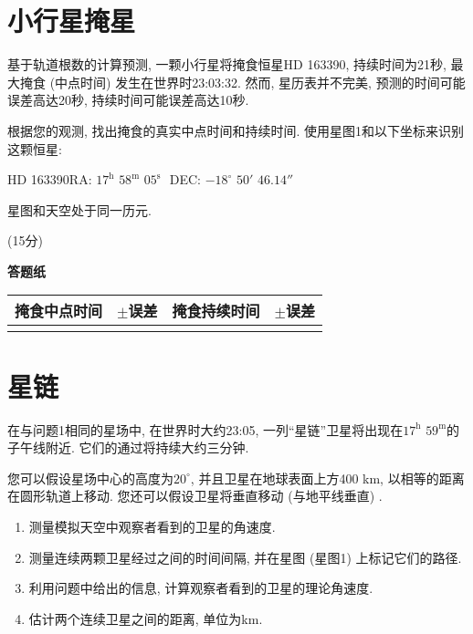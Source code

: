 \documentclass[a4paper,fontset=fandol]{ctexart}
\newcommand{\points}[1]{\par %
	\noindent %
	\hfill (#1分)%
	\vspace{1em}
	}
\begin{document}
	\newpage
	\section{小行星掩星}
	
	基于轨道根数的计算预测, 一颗小行星将掩食恒星HD 163390, 持续时间为21秒, 最大掩食 (中点时间) 发生在世界时23:03:32. 然而, 星历表并不完美, 预测的时间可能误差高达20秒, 持续时间可能误差高达10秒. 
	
	根据您的观测, 找出掩食的真实中点时间和持续时间. 使用星图1和以下坐标来识别这颗恒星:
	
	\hspace{1em}HD 163390\quad RA: $17^\text{h}$ $58^\text{m}$ $05^\text{s}$\,\, DEC: $-18^\circ$ $50'$ $46.14''$
	
	星图和天空处于同一历元. 
	
	\points{15}
	
	\vspace{0em}
	\textbf{\Large 答题纸}
	
	\begin{tabular}{|c|c|c|c|}
		\hline
		掩食中点时间 & $\pm$误差 & 掩食持续时间 & $\pm$误差 \\
		\hline
		& & & \\
		\hline
	\end{tabular}
	
	\vspace{1em}
	
	\section{星链}
	
	在与问题1相同的星场中, 在世界时大约23:05, 一列``星链''卫星将出现在$17^\text{h}$ $59^\text{m}$的子午线附近. 它们的通过将持续大约三分钟. 
	
	您可以假设星场中心的高度为$20^\circ$, 并且卫星在地球表面上方400 km, 以相等的距离在圆形轨道上移动. 您还可以假设卫星将垂直移动 (与地平线垂直) . 
	
	\begin{enumerate}[label=(\alph*)]
		\item 测量模拟天空中观察者看到的卫星的角速度. 
		
		\item 测量连续两颗卫星经过之间的时间间隔, 并在星图 (星图1) 上标记它们的路径. 
		
		\item 利用问题中给出的信息, 计算观察者看到的卫星的理论角速度. 
		
		\item 估计两个连续卫星之间的距离, 单位为km. 
	\end{enumerate}
	
\end{document}
